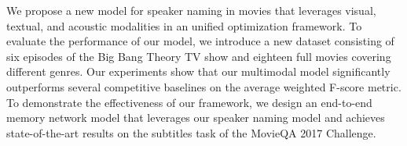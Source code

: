 We propose a new model for speaker naming in movies that leverages visual, textual, and acoustic modalities in an unified optimization framework. To evaluate the performance of our model, we introduce a new dataset  consisting of six episodes of the Big Bang Theory TV show and eighteen full movies covering different genres. Our experiments show that our multimodal model significantly outperforms several competitive baselines on the average weighted F-score metric. To demonstrate the effectiveness of our framework, we design an end-to-end memory network model that leverages our speaker naming model and achieves state-of-the-art results on the subtitles task of the MovieQA 2017 Challenge.
